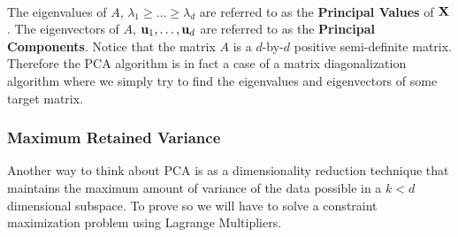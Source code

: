 ~\\ The eigenvalues of $A$, $\lambda_1\geq\ldots\geq\lambda_d$ are referred to as the \textbf{Principal Values} of $\mathbf{X}$. The eigenvectors of $A$, $\mathbf{u}_1,\ldots,\mathbf{u}_d$ are referred to as the \textbf{Principal Components}. Notice that the matrix $A$ is a $d$-by-$d$ positive semi-definite matrix. Therefore the PCA algorithm is in fact a case of a matrix diagonalization algorithm where we simply try to find the eigenvalues and eigenvectors of some target matrix.


\subsubsection{Maximum Retained Variance}
Another way to think about PCA is as a dimensionality reduction technique that maintains the maximum amount of variance of the data possible in a $k<d$ dimensional subspace. To prove so we will have to solve a constraint maximization problem using Lagrange Multipliers. 


